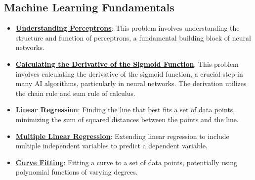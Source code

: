 \documentclass{article}%
\begin{document}
\subsection{Machine Learning Fundamentals}%
\label{subsec:MachineLearningFundamentals}%
\begin{itemize}[leftmargin=*]%
\item \href{https://purdue.brightspace.com/d2l/common/assets/pdfjs-d2l-dist/1.0.14-legacy/web/viewer.html?file=\%2Fcontent\%2Fenforced\%2F1095467-wl.202510.CS.24300.001\%2F02L2-Intro.pdf\%3Fou\%3D1095467\&lang=en-us\&container=d2l-fileviewer-rendered-pdf\&fullscreen=d2l-fileviewer-rendered-pdf-dialog\&height=667#page=45}{\textbf{Understanding Perceptrons}}: This problem involves understanding the structure and function of perceptrons, a fundamental building block of neural networks.%
\item \href{https://purdue.brightspace.com/d2l/common/assets/pdfjs-d2l-dist/1.0.14-legacy/web/viewer.html?file=\%2Fcontent\%2Fenforced\%2F1095467-wl.202510.CS.24300.001\%2F04L1-Linear Algebra Primer.pdf\%3Fou\%3D1095467\&lang=en-us\&container=d2l-fileviewer-rendered-pdf\&fullscreen=d2l-fileviewer-rendered-pdf-dialog\&height=667#page=21}{\textbf{Calculating the Derivative of the Sigmoid Function}}: This problem involves calculating the derivative of the sigmoid function, a crucial step in many AI algorithms, particularly in neural networks. The derivation utilizes the chain rule and sum rule of calculus.%
\item \href{https://purdue.brightspace.com/d2l/common/assets/pdfjs-d2l-dist/1.0.14-legacy/web/viewer.html?file=\%2Fcontent\%2Fenforced\%2F1095467-wl.202510.CS.24300.001\%2F05L2-ML Basics.pdf\%3Fou\%3D1095467\&lang=en-us\&container=d2l-fileviewer-rendered-pdf\&fullscreen=d2l-fileviewer-rendered-pdf-dialog\&height=667#page=6}{\textbf{Linear Regression}}: Finding the line that best fits a set of data points, minimizing the sum of squared distances between the points and the line.%
\item \href{https://purdue.brightspace.com/d2l/common/assets/pdfjs-d2l-dist/1.0.14-legacy/web/viewer.html?file=\%2Fcontent\%2Fenforced\%2F1095467-wl.202510.CS.24300.001\%2F05L2-ML Basics.pdf\%3Fou\%3D1095467\&lang=en-us\&container=d2l-fileviewer-rendered-pdf\&fullscreen=d2l-fileviewer-rendered-pdf-dialog\&height=667#page=11}{\textbf{Multiple Linear Regression}}: Extending linear regression to include multiple independent variables to predict a dependent variable.%
\item \href{https://purdue.brightspace.com/d2l/common/assets/pdfjs-d2l-dist/1.0.14-legacy/web/viewer.html?file=\%2Fcontent\%2Fenforced\%2F1095467-wl.202510.CS.24300.001\%2F05L2-ML Basics.pdf\%3Fou\%3D1095467\&lang=en-us\&container=d2l-fileviewer-rendered-pdf\&fullscreen=d2l-fileviewer-rendered-pdf-dialog\&height=667#page=13}{\textbf{Curve Fitting}}: Fitting a curve to a set of data points, potentially using polynomial functions of varying degrees.%

\end{itemize}
\end{document}
